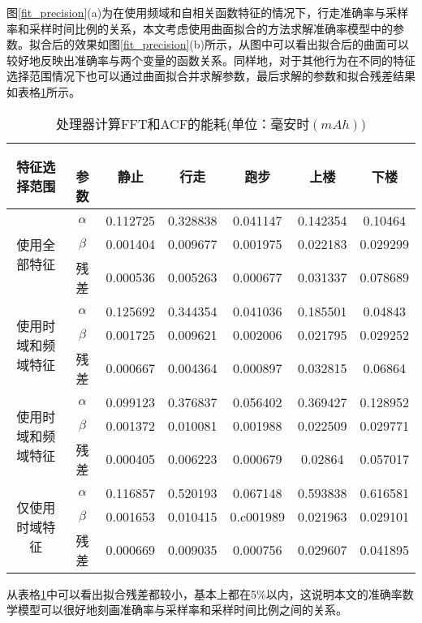 \par 图\ref{fit_precision}(a)为在使用频域和自相关函数特征的情况下，行走准确率与采样率和采样时间比例的关系，本文考虑使用曲面拟合的方法求解准确率模型中的参数。拟合后的效果如图\ref{fit_precision}(b)所示，从图中可以看出拟合后的曲面可以较好地反映出准确率与两个变量的函数关系。同样地，对于其他行为在不同的特征选择范围情况下也可以通过曲面拟合并求解参数，最后求解的参数和拟合残差结果如表格\ref{fit_result}所示。

\begin{table}[htb]
    \centering
    \caption{处理器计算FFT和ACF的能耗(单位：毫安时$(mAh)$)}\label{fit_result}
    \begin{tabular}{ccccccc}
    \toprule
    特征选择范围 & 　参数 & 静止 & 行走 & 跑步 & 上楼 & 下楼\\
    \midrule
    \multirow{3}{2cm}{使用全部特征} & $\alpha$ & 0.112725 & 0.328838 & 0.041147 & 0.142354 & 0.10464 \\
    & $\beta$ & 0.001404 & 0.009677 & 0.001975 & 0.022183 & 0.029299 \\
    & 残差 & 0.000536 & 0.005263 & 0.000677 & 0.031337 & 0.078689 \\
    \midrule
    \multirow{3}{2cm}{使用时域和频域特征} & $\alpha$ & 0.125692 & 0.344354 & 0.041036 & 0.185501 & 0.04843 \\
    & $\beta$ & 0.001725 & 0.009621 & 0.002006 & 0.021795 & 0.029252 \\
    & 残差 & 0.000667 & 0.004364 & 0.000897 & 0.032815 & 0.06864 \\ 
    \midrule
    \multirow{3}{2cm}{使用时域和频域特征} & $\alpha$ & 0.099123 & 0.376837 & 0.056402 & 0.369427 & 0.128952 \\
    & $\beta$ & 0.001372 & 0.010081 & 0.001988 & 0.022509 & 0.029771 \\
    & 残差 & 0.000405 & 0.006223 & 0.000679 & 0.02864 & 0.057017 \\ 
    \midrule
    \multirow{3}{2cm}{仅使用时域特征}  & $\alpha$ & 0.116857 & 0.520193 & 0.067148 & 0.593838 & 0.616581 \\  
    & $\beta$ & 0.001653 & 0.010415 & 0.c001989 & 0.021963 & 0.029101 \\  
    & 残差 & 0.000669 & 0.009035 & 0.000756 & 0.029607 & 0.041895 \\
    \bottomrule
    \end{tabular}
\end{table}
\par 从表格\ref{fit_result}中可以看出拟合残差都较小，基本上都在5\%以内，这说明本文的准确率数学模型可以很好地刻画准确率与采样率和采样时间比例之间的关系。

